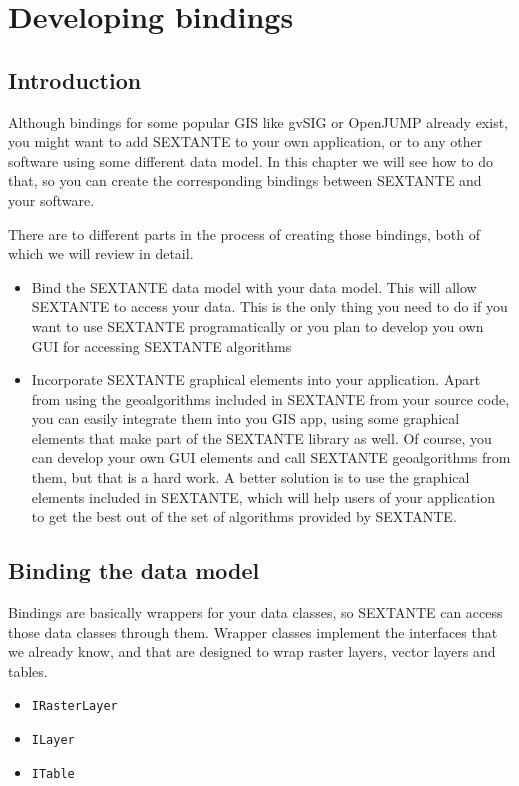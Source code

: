 \chapter{Developing bindings}\label{DevelopingBindings}

\section{Introduction}

Although bindings for some popular GIS like gvSIG or OpenJUMP already exist, you might want to add SEXTANTE to your own application, or to any other software using some different data model. In this chapter we will see how to do that, so you can create the corresponding bindings between SEXTANTE and your software.

There are to different parts in the process of creating those bindings, both of which we will review in detail.

\begin{itemize}
 \item Bind the SEXTANTE data model with your data model. This will allow SEXTANTE to access your data. This is the only thing you need to do if you want to use SEXTANTE programatically or you plan to develop you own GUI for accessing SEXTANTE algorithms
\item Incorporate SEXTANTE graphical elements into your application. Apart from using the geoalgorithms included in SEXTANTE from your source code, you can easily integrate them into you GIS app, using some graphical elements that make part of the SEXTANTE library as well. Of course, you can develop your own GUI elements and call SEXTANTE geoalgorithms from them, but that is a hard work. A better solution is to use the graphical elements included in SEXTANTE, which will help users of your application to get the best out of the set of algorithms provided by SEXTANTE.
\end{itemize}

\section{Binding the data model}

Bindings are basically wrappers for your data classes, so SEXTANTE can access those data classes through them. Wrapper classes implement the interfaces that we already know, and that are designed to wrap raster layers, vector layers and tables.

\begin{itemize}
 \item \texttt{IRasterLayer}
\item \texttt{ILayer}
\item \texttt{ITable}
\end{itemize}

